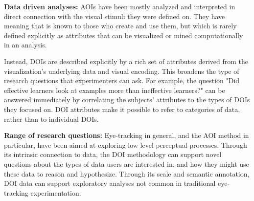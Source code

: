 \vspace{2mm}

\noindent \textbf{Data driven analyses: } AOIs have been mostly analyzed and interpreted in direct connection with the visual stimuli they were defined on. They have meaning that is known to those who create and use them, but which is rarely defined explicitly as attributes that can be visualized or mined computationally in an analysis.  

Instead, DOIs are described explicitly by a rich set of attributes derived from the visualization's underlying data and visual encoding. This broadens the type of research questions that experimenters can ask. For example, the question "Did effective learners look at examples more than ineffective learners?" can be answered immediately by correlating the subjects' attributes to the types of DOIs they focused on. DOI attributes make it possible to refer to categories of data, rather than to individual DOIs.

\vspace{2mm}

\noindent \textbf{Range of research questions: } Eye-tracking in general, and the AOI method in particular, have been aimed at exploring low-level perceptual processes. Through its intrinsic connection to data, the DOI methodology can support novel questions about the types of data users are interested in, and how they might use these data to reason and hypothesize. Through its scale and semantic annotation, DOI data can support exploratory analyses not common in traditional eye-tracking experimentation.



